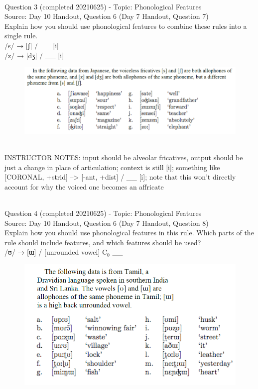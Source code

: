\documentclass[12pt]{article}
\begin{document}
~\\

{\large Question 3} (completed 20210625) - Topic: Phonological Features\\
Source: Day 10 Handout, Question 6 (Day 7 Handout, Question 7)\\

Explain how you should use phonological features to combine these rules into a single rule.\\

/s/ → {[ʃ]} / \_\_ {[i]} \\/z/ → {[dʒ]} / \_\_ {[i]}

\begin{figure}[H]
\includegraphics{../images/japanese.png}
\end{figure}

~\\
INSTRUCTOR NOTES: input should be alveolar fricatives, output should be just a change in place of articulation; context is still [i]; something like [CORONAL, +strid] --> [-ant, +dist] / \_\_ [i]; note that this won't directly account for why the voiced one becomes an affricate


~\\

{\large Question 4} (completed 20210625) - Topic: Phonological Features\\
Source: Day 10 Handout, Question 6 (Day 7 Handout, Question 8)\\

Explain how you should use phonological features in this rule. Which parts of the rule should include features, and which features should be used?\\

/ʊ/ → {[ɯ]} / {[unrounded vowel]} C$_0$ \_\_

\begin{figure}[H]
\includegraphics{../images/tamil.png}
\end{figure}
\end{document}
